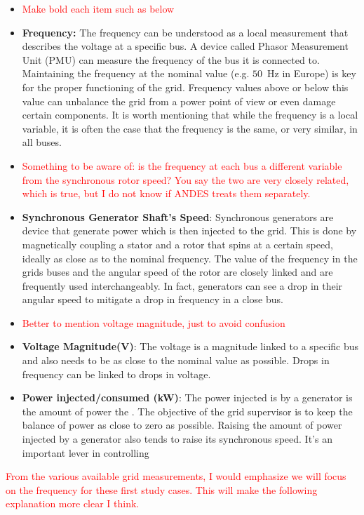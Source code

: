 \documentclass{article}
\begin{document}
\begin{itemize}
    \item \textcolor{red}{Make bold each item such as below}
    \item \textbf{Frequency:} The frequency can be understood as a local measurement that describes the voltage at a specific bus. A device called Phasor Measurement Unit (PMU) can measure the frequency of the bus it is connected to. Maintaining the frequency at the nominal value (e.g. $50$~Hz in Europe) is key for the proper functioning of the grid. Frequency values above or below this value can unbalance the grid from a power point of view or even damage certain components. It is worth mentioning that while the frequency is a local variable, it is often the case that the frequency is the same, or very similar, in all buses.   
    \item \textcolor{red}{Something to be aware of: is the frequency at each bus a different variable from the synchronous rotor speed? You say the two are very closely related, which is true, but I do not know if ANDES treats them separately.}
    \item \textbf{Synchronous Generator Shaft's Speed}: Synchronous generators are device that generate power which is then injected to the grid. This is done by magnetically coupling a stator and a rotor that spins at a certain speed, ideally as close as to the nominal frequency. The value of the frequency in the grids buses and the angular speed of the rotor are closely linked and are frequently used interchangeably. In fact, generators can see a drop in their angular speed to mitigate a drop in frequency in a close bus.
    \item \textcolor{red}{Better to mention voltage magnitude, just to avoid confusion}
    \item \textbf{Voltage Magnitude(V)}: The voltage is a magnitude linked to a specific bus and also needs to be as close to the nominal value as possible. Drops in frequency can be linked to drops in voltage.
    \item \textbf{Power injected/consumed (kW)}: The power injected is by a generator is the amount of power the . The objective of the grid supervisor is to keep the balance of power as close to zero as possible. Raising the amount of power injected by a generator also tends to raise its synchronous speed. It's an important lever in controlling  
\end{itemize}

\textcolor{red}{From the various available grid measurements, I would emphasize we will focus on the frequency for these first study cases. This will make the following explanation more clear I think.}
\end{document}
